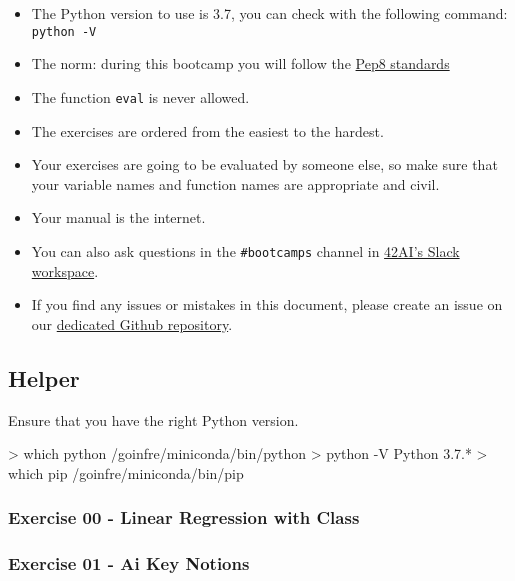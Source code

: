 \documentclass[]{article}
\newenvironment{Shaded}{\begin{snugshade}}{\end{snugshade}}
\newcommand{\NormalTok}[1]{\textcolor[rgb]{0.81,0.81,0.76}{#1}}
\begin{document}
\begin{itemize}
\item
  The Python version to use is 3.7, you can check with the following
  command: \texttt{python\ -V}
\item
  The norm: during this bootcamp you will follow the
  \href{https://www.python.org/dev/peps/pep-0008/}{Pep8 standards}
\item
  The function \texttt{eval} is never allowed.
\item
  The exercises are ordered from the easiest to the hardest.
\item
  Your exercises are going to be evaluated by someone else, so make sure
  that your variable names and function names are appropriate and civil.
\item
  Your manual is the internet.
\item
  You can also ask questions in the \texttt{\#bootcamps} channel in
  \href{https://42-ai.slack.com}{42AI's Slack workspace}.
\item
  If you find any issues or mistakes in this document, please create an
  issue on our
  \href{https://github.com/42-AI/bootcamp_machine-learning/issues}{dedicated
  Github repository}.
\end{itemize}

\hypertarget{helper}{%
\subsection{Helper}\label{helper}}

Ensure that you have the right Python version.

\begin{Shaded}
\begin{Highlighting}[]
\NormalTok{> which python}
\NormalTok{/goinfre/miniconda/bin/python}
\NormalTok{> python -V}
\NormalTok{Python 3.7.*}
\NormalTok{> which pip}
\NormalTok{/goinfre/miniconda/bin/pip}
\end{Highlighting}
\end{Shaded}

\hypertarget{exercise-00---linear-regression-with-class}{%
\subsubsection{Exercise 00 - Linear Regression with
Class}\label{exercise-00---linear-regression-with-class}}

\hypertarget{exercise-01---ai-key-notions}{%
\subsubsection{Exercise 01 - Ai Key
Notions}\label{exercise-01---ai-key-notions}}
\end{document}
